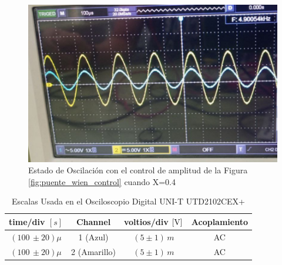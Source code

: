             \begin{figure}[H]
                \centering
                \renewcommand{\figurename}{Imagen}
                \includegraphics[width=15cm]{Imagenes/exp_puente_wien_control45.png}
                \caption{Estado de Oscilación con el control de amplitud de la Figura \ref{fig:puente_wien_control} cuando X=0.4}
                \label{fig:exp_puente_wien_control45}
            \end{figure}

            \begin{table}[H]
                \centering
                \begin{tabular}{|c|c|c|c|}
                    \hline
                    \textbf{time/div} $[s]$ & \textbf{Channel} & \textbf{voltios/div $[\volt]$} & \textbf{Acoplamiento} \\ \hline
                    $(100 \, \pm 20) \mu  $ & 1 (Azul)  &   $(5 \pm 1)  \, m $ & AC \\ \hline  
                    $(100 \, \pm 20) \mu  $ & 2 (Amarillo)  &   $(5 \pm 1)  \, m $ & AC \\ \hline  
                \end{tabular}
                \caption{Escalas Usada en el Osciloscopio Digital UNI-T UTD2102CEX+}
                \label{tab:escala_puente_wien_control45}
            \end{table}

